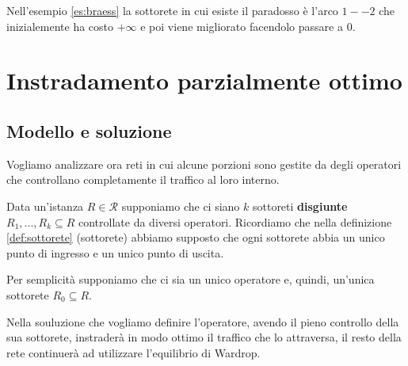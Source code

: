 \documentclass[a4paper]{article}
\theoremstyle{plain}
\theoremstyle{definition}
\theoremstyle{remark}
\begin{document}
Nell'esempio \ref{es:braess} la sottorete in cui esiste il paradosso è
l'arco $1 -- 2$ che inizialemente ha costo $+\infty$ e poi viene
migliorato facendolo passare a $0$.

\section{Instradamento parzialmente ottimo}

\subsection{Modello e soluzione}
\label{sec:por-modello}

Vogliamo analizzare ora reti in cui alcune porzioni sono gestite da
degli operatori che controllano completamente il traffico al loro
interno.

Data un'istanza $R\in \mathcal{R}$ supponiamo che ci siano $k$
sottoreti \textbf{disgiunte} $R_1,...,R_k \subseteq R$ controllate da
diversi operatori. Ricordiamo che nella definizione
\ref{def:sottorete} (sottorete) abbiamo supposto che ogni sottorete
abbia un unico punto di ingresso e un unico punto di uscita.

Per semplicità supponiamo che ci sia un unico operatore e, quindi,
un'unica sottorete $R_0 \subseteq R$.

Nella souluzione che vogliamo definire l'operatore, avendo il pieno
controllo della sua sottorete, instraderà in modo ottimo il traffico
che lo attraversa, il resto della rete continuerà ad utilizzare
l'equilibrio di Wardrop.
\end{document}
